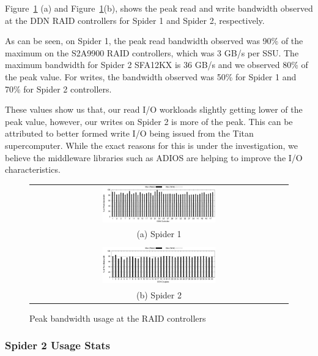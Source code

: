 Figure~\ref{fig:ddnpeakBW} (a) and Figure~\ref{fig:ddnpeakBW}(b), shows the
peak read and write bandwidth observed at the DDN RAID controllers for Spider 1
and Spider 2, respectively. 

As can be seen, on Spider 1, the peak read bandwidth observed was 90\% of the
maximum on the S2A9900 RAID controllers, which was 3 GB/s per SSU. The maximum
bandwidth for Spider 2 SFA12KX is 36 GB/s and we observed 80\% of the peak
value. For writes, the bandwidth observed was 50\% for Spider 1 and 70\% for
Spider 2 controllers. 
 
These values show us that, our read I/O workloads slightly getting lower of the
peak value, however, our writes on Spider 2 is more of the peak. This can be
attributed to better formed write I/O being issued from the Titan
supercomputer. While the exact reasons for this is under the investigation, we
believe the middleware libraries such as ADIOS are helping to improve the I/O
characteristics. 


\begin{figure}[!thb]
\begin{center}
\begin{tabular}{c}
{\includegraphics[width=0.450\textwidth]{./figs/spider1-bw-perc-max.eps}}\\
{(a) Spider 1}\\
\\
{\includegraphics[width=0.450\textwidth]{./figs/spider2-bw-perc-max.eps}}\\
{(b) Spider 2}\\
\end{tabular}
\vspace{-0.1in}
\caption{Peak bandwidth usage at the RAID controllers}
\label{fig:ddnpeakBW}
\end{center}
\end{figure}

\subsubsection{Spider 2 Usage Stats}

